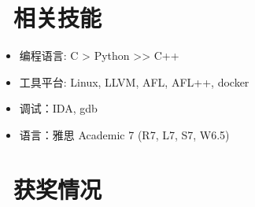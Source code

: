 \documentclass{resume}
\begin{document}

\section{\faCogs\ 相关技能}
\begin{itemize}[parsep=0.5ex]
  \item 编程语言: C > Python >> C++ 
  \item 工具平台: Linux, LLVM, AFL, AFL++, docker
  \item 调试：IDA, gdb
  \item 语言：雅思 Academic 7 (R7, L7, S7, W6.5)
\end{itemize} 

\section{\faHeartO\ 获奖情况}
\end{document}
